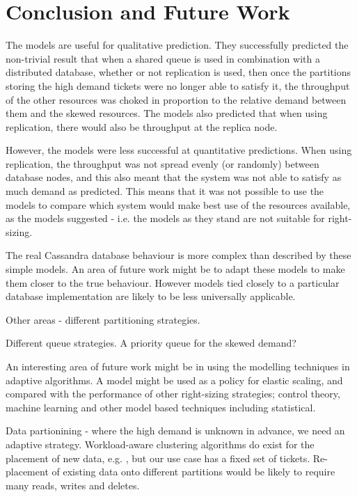 %
%

\section{Conclusion and Future Work}

\begin{shaded}
	
The models are useful for qualitative prediction.  They successfully predicted the non-trivial result that when a shared queue is used in combination with a distributed database, whether or not replication is used, then once the partitions storing the high demand tickets were no longer able to satisfy it, the throughput of the other resources was choked in proportion to the relative demand between them and the skewed resources.  The models also predicted that when using replication, there would also be throughput at the replica node.

However, the models were less successful at quantitative predictions.  When using replication, the throughput was not spread evenly (or randomly) between database nodes, and this also meant that the system was not able to satisfy as much demand as predicted.  This means that it was not possible to use the models to compare which system would make best use of the resources available, as the models suggested - i.e. the models as they stand are not suitable for right-sizing.

The real Cassandra database behaviour is more complex than described by these simple models.  An area of future work might be to adapt these models to make them closer to the true behaviour.  However models tied closely to a particular database implementation are likely to be less universally applicable.

Other areas - different partitioning strategies.

Different queue strategies.  A priority queue for the skewed demand?

An interesting area of future work might be in using the modelling techniques in adaptive algorithms.  A model might be used as a policy for elastic scaling, and compared with the performance of other right-sizing strategies; control theory, machine learning and other model based techniques including statistical.

Data partionining - where the high demand is unknown in advance, we need an adaptive strategy.  Workload-aware clustering algorithms do exist for the placement of new data, e.g. \cite{RN63}, but our use case has a fixed set of tickets.  Re-placement of existing data onto different partitions would be likely to require many reads, writes and deletes.


\end{shaded}
